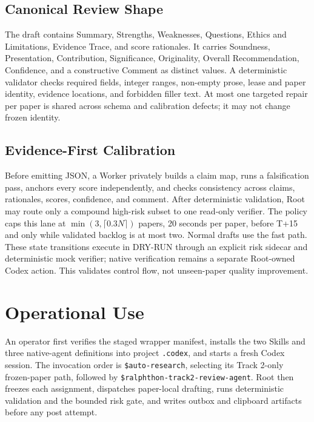 \documentclass{article}
\begin{document}
\subsection{Canonical Review Shape}

The draft contains Summary, Strengths, Weaknesses, Questions, Ethics and
Limitations, Evidence Trace, and score rationales. It carries Soundness,
Presentation, Contribution, Significance, Originality, Overall Recommendation,
Confidence, and a constructive Comment as distinct values. A deterministic
validator checks required fields, integer ranges, non-empty prose, lease and
paper identity, evidence locations, and forbidden filler text. At most one
targeted repair per paper is shared across schema and calibration defects; it
may not change frozen identity.

\subsection{Evidence-First Calibration}

Before emitting JSON, a Worker privately builds a claim map, runs a
falsification pass, anchors every score independently, and checks consistency
across claims, rationales, scores, confidence, and comment. After deterministic
validation, Root may route only a compound high-risk subset to one read-only
verifier. The policy caps this lane at
$\min(3,\lceil 0.3N\rceil)$ papers, 20 seconds per paper, before T+15 and only
while validated backlog is at most two. Normal drafts use the fast path. These
state transitions execute in DRY-RUN through an explicit risk sidecar and
deterministic mock verifier; native verification remains a separate Root-owned
Codex action. This validates control flow, not unseen-paper quality improvement.

\section{Operational Use}

An operator first verifies the staged wrapper manifest, installs the two Skills
and three native-agent definitions into project \texttt{.codex}, and starts a
fresh Codex session. The invocation order is \texttt{\$auto-research}, selecting
its Track 2-only frozen-paper path, followed by
\texttt{\$ralphthon-track2-review-agent}. Root then freezes each assignment,
dispatches paper-local drafting, runs deterministic validation and the bounded
risk gate, and writes outbox and clipboard artifacts before any post attempt.
\end{document}

